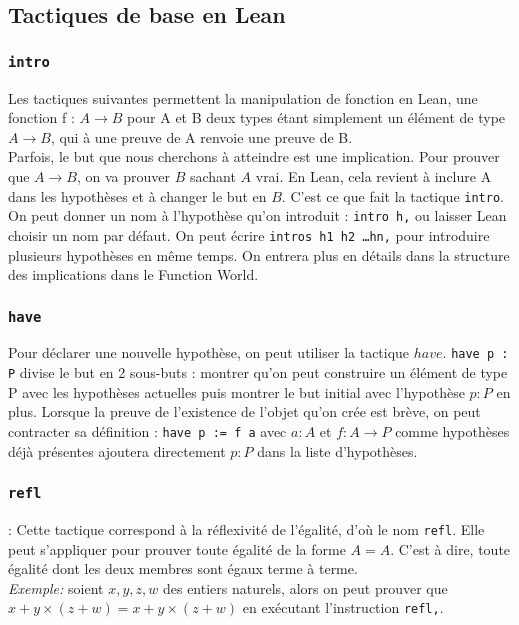 \subsection{Tactiques de base en Lean}


\subsubsection{\texttt{intro}}
Les tactiques suivantes permettent la manipulation de fonction en Lean, une fonction f : $A\to B$ pour A et B deux types étant simplement un élément de type $A\to B$, qui à une preuve de A renvoie une preuve de B.\\

Parfois, le but que nous cherchons à atteindre est une implication. Pour prouver que $A \to B$, on va prouver $B$ sachant $A$ vrai. En Lean, cela revient à inclure A dans les hypothèses et à changer le but en $B$. C'est ce que fait la tactique \texttt{intro}. On peut donner un nom à l'hypothèse qu'on introduit : \texttt{intro h,} ou laisser Lean choisir un nom par défaut.
On peut écrire \texttt{intros h1 h2 \ldots hn,} pour introduire plusieurs hypothèses en même temps.
On entrera plus en détails dans la structure des implications dans le Function World.

\subsubsection{\texttt{have}}

Pour déclarer une nouvelle hypothèse, on peut utiliser la tactique $have$.
\texttt{have p : P} divise le but en 2 sous-buts : montrer qu'on peut construire un élément de type P avec les hypothèses actuelles puis montrer le but initial avec l'hypothèse $p : P$ en plus.
Lorsque la preuve de l'existence de l'objet qu'on crée est brève, on peut contracter sa définition :
\texttt{have p := f a} avec $a : A$ et $f : A \to P$ comme hypothèses déjà présentes ajoutera directement $p : P$ dans la liste d'hypothèses.  


\subsubsection{\texttt{refl}}: Cette tactique correspond à la réflexivité de l'égalité, d'où le nom \texttt{refl}. Elle peut s'appliquer pour prouver toute égalité de la forme $A=A$. C'est à dire, toute égalité dont les deux membres sont égaux terme à terme. \\
\textit{Exemple:} soient $x,y,z,w$ des entiers naturels, alors on peut prouver que $x+y \times (z+w)=x+y \times (z+w)$ en exécutant l'instruction \texttt{refl,}.
